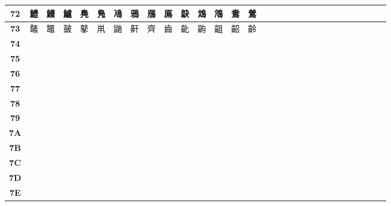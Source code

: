 \begin{table}[H]
\begin{tabular}{|Sc|Sc|Sc|Sc|Sc|Sc|Sc|Sc|Sc|Sc|Sc|Sc|Sc|Sc|Sc|}
\textbf{72} & 鱧 & 鱶 & 鱸 & 鳧 & 鳬 & 鳰 & 鴉 & 鴈 & 鳫 & 鴃 & 鴆 & 鴪 & 鴦 & 鶯 \\ \hline
\textbf{73} & 鼇 & 鼈 & 皷 & 鼕 & 鼡 & 鼬 & 鼾 & 齊 & 齒 & 齔 & 齣 & 齟 & 齠 & 齡 \\ \hline
\textbf{74} &  &  &  &  &  &  &  &  &  &  &  &  &  &  \\ \hline
\textbf{75} &  &  &  &  &  &  &  &  &  &  &  &  &  &  \\ \hline
\textbf{76} &  &  &  &  &  &  &  &  &  &  &  &  &  &  \\ \hline
\textbf{77} &  &  &  &  &  &  &  &  &  &  &  &  &  &  \\ \hline
\textbf{78} &  &  &  &  &  &  &  &  &  &  &  &  &  &  \\ \hline
\textbf{79} &  &  &  &  &  &  &  &  &  &  &  &  &  &  \\ \hline
\textbf{7A} &  &  &  &  &  &  &  &  &  &  &  &  &  &  \\ \hline
\textbf{7B} &  &  &  &  &  &  &  &  &  &  &  &  &  &  \\ \hline
\textbf{7C} &  &  &  &  &  &  &  &  &  &  &  &  &  &  \\ \hline
\textbf{7D} &  &  &  &  &  &  &  &  &  &  &  &  &  &  \\ \hline
\textbf{7E} &  &  &  &  &  &  &  &  &  &  &  &  &  &  \\ \hline
\end{tabular}
\end{table}

